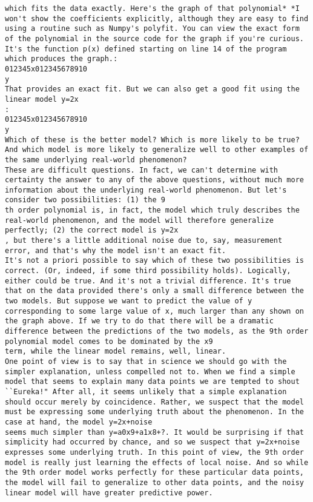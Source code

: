 \begin{lstlisting}
which fits the data exactly. Here's the graph of that polynomial* *I won't show the coefficients explicitly, although they are easy to find using a routine such as Numpy's polyfit. You can view the exact form of the polynomial in the source code for the graph if you're curious. It's the function p(x) defined starting on line 14 of the program which produces the graph.:
012345x012345678910
y
That provides an exact fit. But we can also get a good fit using the linear model y=2x
:
012345x012345678910
y
Which of these is the better model? Which is more likely to be true? And which model is more likely to generalize well to other examples of the same underlying real-world phenomenon?
These are difficult questions. In fact, we can't determine with certainty the answer to any of the above questions, without much more information about the underlying real-world phenomenon. But let's consider two possibilities: (1) the 9
th order polynomial is, in fact, the model which truly describes the real-world phenomenon, and the model will therefore generalize perfectly; (2) the correct model is y=2x
, but there's a little additional noise due to, say, measurement error, and that's why the model isn't an exact fit.
It's not a priori possible to say which of these two possibilities is correct. (Or, indeed, if some third possibility holds). Logically, either could be true. And it's not a trivial difference. It's true that on the data provided there's only a small difference between the two models. But suppose we want to predict the value of y
corresponding to some large value of x, much larger than any shown on the graph above. If we try to do that there will be a dramatic difference between the predictions of the two models, as the 9th order polynomial model comes to be dominated by the x9
term, while the linear model remains, well, linear.
One point of view is to say that in science we should go with the simpler explanation, unless compelled not to. When we find a simple model that seems to explain many data points we are tempted to shout ``Eureka!" After all, it seems unlikely that a simple explanation should occur merely by coincidence. Rather, we suspect that the model must be expressing some underlying truth about the phenomenon. In the case at hand, the model y=2x+noise
seems much simpler than y=a0x9+a1x8+?. It would be surprising if that simplicity had occurred by chance, and so we suspect that y=2x+noise
expresses some underlying truth. In this point of view, the 9th order model is really just learning the effects of local noise. And so while the 9th order model works perfectly for these particular data points, the model will fail to generalize to other data points, and the noisy linear model will have greater predictive power.

\end{lstlisting}
